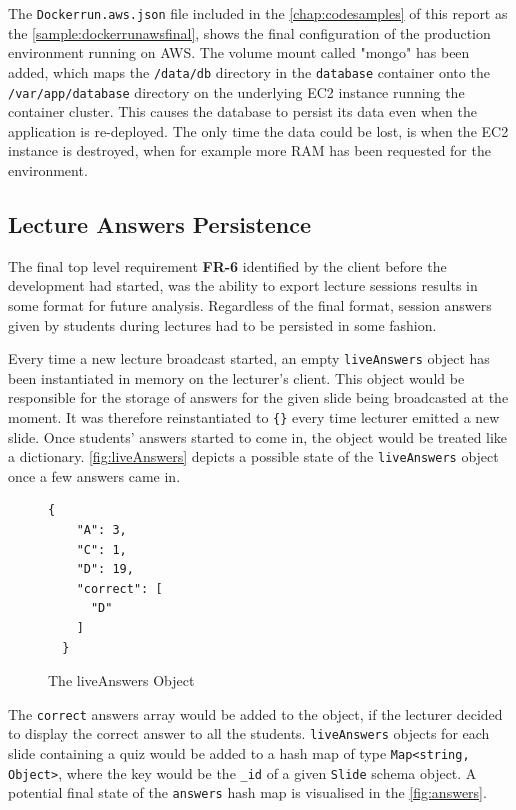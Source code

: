 The \texttt{Dockerrun.aws.json} file included in the \autoref{chap:codesamples} of this report
as the \autoref{sample:dockerrunawsfinal}, shows the final configuration of the production
environment running on AWS. The volume mount called "mongo" has been added, which maps the
\texttt{/data/db} directory in the \texttt{database} container onto the \texttt{/var/app/database}
directory on the underlying EC2 instance running the container cluster. This causes the database
to persist its data even when the application is re-deployed. The only time the data could
be lost, is when the EC2 instance is destroyed, when for example more RAM has been requested
for the environment.

\subsection{Lecture Answers Persistence}
The final top level requirement \textbf{FR-6} identified by the client before the
development had started, was the ability to export lecture sessions results in some format
for future analysis. Regardless of the final format, session answers given by students
during lectures had to be persisted in some fashion.

Every time a new lecture broadcast
started, an empty \texttt{liveAnswers} object has been instantiated in memory on the lecturer's
client. This object would be responsible for the storage of answers for the given slide
being broadcasted at the moment. It was therefore reinstantiated to \texttt{\{\}} every time
lecturer emitted a new slide. Once students' answers started to come in, the object would be treated
like a dictionary. \autoref{fig:liveAnswers} depicts a possible state of the \texttt{liveAnswers}
object once a few answers came in.

\begin{figure}[h!]
  \begin{lstlisting}[basicstyle=\small]
  {
    "A": 3,
    "C": 1,
    "D": 19,
    "correct": [
      "D"
    ]
  }
  \end{lstlisting}
  \caption{The liveAnswers Object}
  \label{fig:liveAnswers}
\end{figure}

The \texttt{correct} answers array would be added to the object, if the lecturer decided to
display the correct answer to all the students. \texttt{liveAnswers} objects for each
slide containing a quiz would be added to a hash map of type \texttt{Map<string, Object>}, where
the key would be the \texttt{\_id} of a given \texttt{Slide} schema object. A potential
final state of the \texttt{answers} hash map is visualised in the \autoref{fig:answers}.

